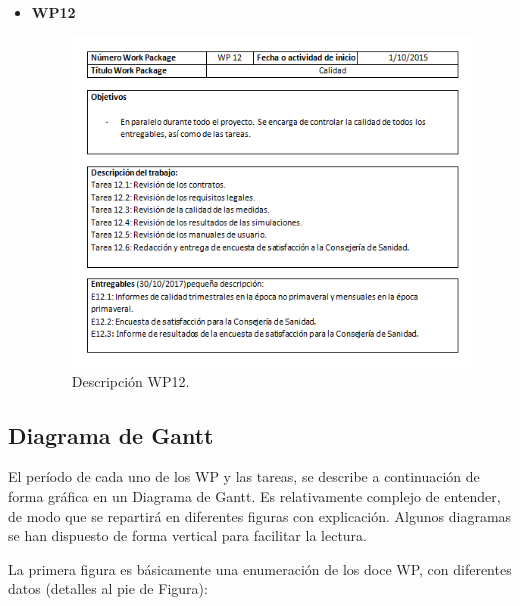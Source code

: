 \documentclass[12pt,oneside,a4paper]{article}
\numberwithin{figure}{section}
\begin{document}
\begin{itemize}
\item \textbf{WP12}

\begin{figure}[H]
\begin{center}
\includegraphics[scale=1]{WP12.png}
\caption{Descripción WP12.}
\label{fig:WP12}
\end{center}
\end{figure}
\end{itemize}
\clearpage


\subsection{Diagrama de Gantt}

El período de cada uno de los WP y las tareas, se describe a continuación de forma gráfica en un Diagrama de Gantt. Es relativamente complejo de entender, de modo que se repartirá en diferentes figuras con explicación. Algunos diagramas se han dispuesto de forma vertical para facilitar la lectura.

La primera figura es básicamente una enumeración de los doce WP, con diferentes datos (detalles al pie de Figura):
\end{document}
